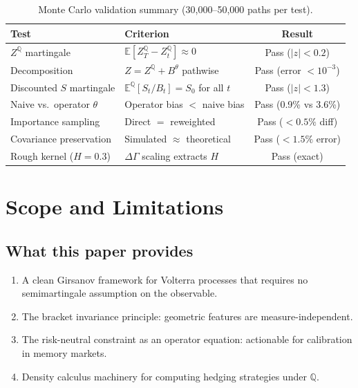 \documentclass[11pt]{article}
\theoremstyle{plain}
\theoremstyle{definition}
\theoremstyle{remark}
\newcommand{\E}{\mathbb{E}}
\newcommand{\QQ}{\mathbb{Q}}
\newcommand{\dGamma}{\Delta\Gamma}
\begin{document}
\begin{table}[h]
\centering
\caption{Monte Carlo validation summary (30{,}000--50{,}000 paths per test).}
\label{tab:mc-summary}
\begin{tabular}{lp{5.5cm}c}
\hline
\textbf{Test} & \textbf{Criterion} & \textbf{Result} \\
\hline
$Z^{\QQ}$ martingale & $\E[Z^{\QQ}_T - Z^{\QQ}_t] \approx 0$ & Pass ($|z| < 0.2$) \\
Decomposition & $Z = Z^{\QQ} + B^\theta$ pathwise & Pass (error $< 10^{-3}$) \\
Discounted $S$ martingale & $\E^{\QQ}[S_t/B_t] = S_0$ for all $t$ & Pass ($|z| < 1.3$) \\
Naive vs.\ operator $\theta$ & Operator bias $<$ naive bias & Pass (0.9\% vs 3.6\%) \\
Importance sampling & Direct $=$ reweighted & Pass ($< 0.5\%$ diff) \\
Covariance preservation & Simulated $\approx$ theoretical & Pass ($< 1.5\%$ error) \\
Rough kernel ($H = 0.3$) & $\dGamma$ scaling extracts $H$ & Pass (exact) \\
\hline
\end{tabular}
\end{table}

\section{Scope and Limitations}\label{sec:limitations}

\subsection{What this paper provides}

\begin{enumerate}
\item A clean Girsanov framework for Volterra processes that requires no
semimartingale assumption on the observable.
\item The bracket invariance principle: geometric features are measure-independent.
\item The risk-neutral constraint as an operator equation: actionable for
calibration in memory markets.
\item Density calculus machinery for computing hedging strategies under $\QQ$.
\end{enumerate}
\end{document}
